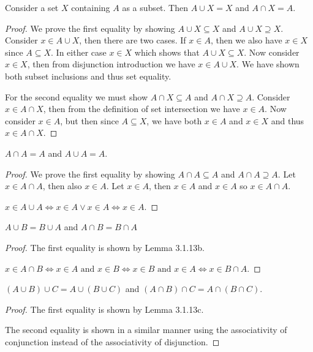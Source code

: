 \documentclass[12pt]{article}
\newenvironment{proposition}[2][Proposition]{\begin{trivlist}
\item[\hskip \labelsep {\bfseries #1}\hskip \labelsep {\bfseries #2}]}{\end{trivlist}}
\begin{document}
\begin{proposition}{3.1.28b}
	Consider a set $ X $ containing $ A $ as a subset.
	Then $ A \cup X = X $ and $ A \cap X = A $.
\end{proposition}
\begin{proof}
	We prove the first equality by showing $ A \cup X \subseteq X $ and $ A \cup X \supseteq X $.
	Consider $ x \in A \cup X $, then there are two cases.
	If $ x \in A $, then we also have $ x \in X $ since $ A \subseteq X $.
	In either case $ x \in X $ which shows that $ A \cup X \subseteq X $.
	Now consider $ x \in X $, then from disjunction introduction we have $ x \in A \cup X $.
	We have shown both subset inclusions and thus set equality.
	
	For the second equality we must show $ A \cap X \subseteq A $ and $ A \cap X \supseteq A $.
	Consider $ x \in A \cap X $, then from the definition of set intersection we have $ x \in A $.
	Now consider $ x \in A $, but then since $ A \subseteq X $, we have both $ x \in A $ and $ x \in X $ and thus $ x \in A \cap X $.
\end{proof}

\begin{proposition}{3.1.28c}
	$ A \cap A = A $ and $ A \cup A = A $.
\end{proposition}
\begin{proof}
	We prove the first equality by showing $ A \cap A \subseteq A $ and $ A \cap A \supseteq A $.
	Let $ x \in A \cap A $, then also $ x \in A $.
	Let $ x \in A $, then $ x \in A $ and $ x \in A $ so $ x \in A \cap A $.
	
	$ x \in A \cup A \iff x \in A \lor x \in A \iff x \in A $.
\end{proof}

\begin{proposition}{3.1.28d}
	$ A \cup B = B \cup A $ and $ A \cap B = B \cap A $
\end{proposition}
\begin{proof}
	The first equality is shown by Lemma 3.1.13b.
	
	$ x \in A \cap B \iff x \in A \text{ and } x \in B \iff x \in B \text{ and } x \in A \iff x \in B \cap A $.
\end{proof}

\begin{proposition}{3.1.28e}
	$ (A \cup B) \cup C = A \cup (B \cup C) $ and $ (A \cap B) \cap C = A \cap (B \cap C) $.
\end{proposition}
\begin{proof}
	The first equality is shown by Lemma 3.1.13c.
	
	The second equality is shown in a similar manner using the associativity of conjunction instead of the associativity of disjunction.
\end{proof}
\end{document}
